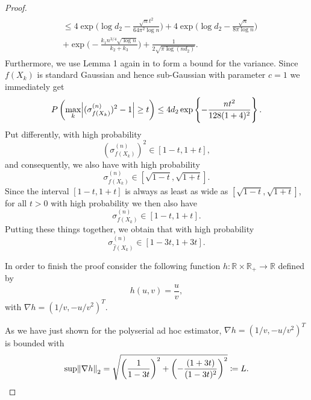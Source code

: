 \begin{proof}
\begin{multline*}
        \begin{aligned}
             & \leq 4\exp\Big(\log d_2 -\frac{\sqrt{n}t^2}{64 \pi^2\log n}\Big) +  4\exp\Big(\log d_2 - \frac{\sqrt{n}}{8\pi\log n}\Big) \\
             & +  \exp\Big(- \frac{k_1 n^{3/4} \sqrt{\log n}}{k_2+ k_3} \Big) + \frac{1}{2\sqrt{\pi \log(nd_2)}}.
        \end{aligned}
    \end{multline*}
    Furthermore, we use Lemma 1 again in \cite{Ravikumar11} to form a bound for the variance. Since $f(X_k)$ is standard Gaussian and hence sub-Gaussian with parameter $c = 1$ we immediately get
    \begin{equation*}
        P\left(\max_k \abs{(\sigma^{(n)}_{{f}(X_k)})^2 - 1} \geq t \right) \leq 4d_2\exp \left\{- \frac{nt^2}{128(1+4)^2} \right\}.
    \end{equation*}
    Put differently, with high probability
    \begin{equation*}
        (\sigma^{(n)}_{{f}(X_k)})^2 \in [1 - t, 1+ t],
    \end{equation*}
    and consequently, we also have with high probability
    \begin{equation*}
        \sigma^{(n)}_{{f}(X_k)} \in [\sqrt{1 -t}, \sqrt{1+t} ].
    \end{equation*}
    Since the interval $[1 -t, 1+t ]$ is always as least as wide as $[\sqrt{1 -t}, \sqrt{1+t} ]$, for all $t >0$ with high probability we then also have
    \begin{equation*}
        \sigma^{(n)}_{{f}(X_k)} \in [1 -t, 1+t ].
    \end{equation*}
    Putting these things together, we obtain that with high probability
    \begin{equation*}
        \sigma^{(n)}_{\hat{f}(X_k)} \in [1- 3t, 1 +3t].
    \end{equation*}

    In order to finish the proof consider the following function $h: \mathbb{R}\times \mathbb{R}_+ \to \mathbb{R}$ defined by
    \begin{equation*}
        h(u,v) = \frac{u}{v},
    \end{equation*}
    with $\nabla h = (1/v, -u/v^{2})^{T}$.

    As we have just shown for the polyserial ad hoc estimator, $\nabla h = (1/v, -u/v^2)^T$ is bounded with
    \begin{equation*}
        \sup \norm{\nabla h}_2 = \sqrt{\left(\frac{1}{1- 3t}\right)^2 + \left(-\frac{(1 + 3t)}{(1 - 3t)^2}\right)^2} \coloneqq L.
    \end{equation*}


\end{proof}

